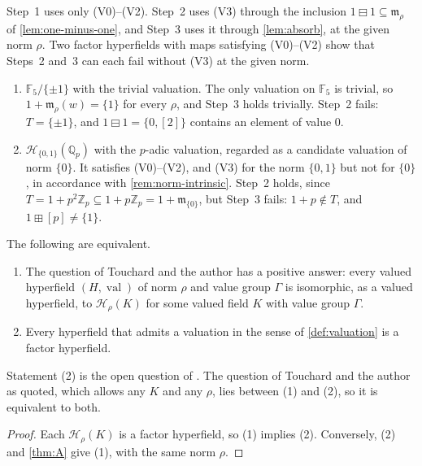 \documentclass[11pt]{amsart}
\numberwithin{equation}{section}
\newcommand{\hplus}{\boxplus}
\newcommand{\hminus}{\boxminus}
\newcommand{\val}{\operatorname{val}}
\newcommand{\m}{\mathfrak m}
\newcommand{\Hr}{\mathcal H_\rho}
\newcommand{\Z}{\mathbb Z}
\newcommand{\F}{\mathbb F}
\newcommand{\cls}[1]{[#1]}
\begin{document}
\begin{remark}\label{rem:audit}
Step~1 uses only (V0)--(V2). Step~2 uses (V3) through the inclusion $1\hminus1\subseteq\m_\rho$ of \cref{lem:one-minus-one}, and Step~3 uses it through \cref{lem:absorb}, at the given norm $\rho$. Two factor hyperfields with maps satisfying (V0)--(V2) show that Steps~2 and~3 can each fail without (V3) at the given norm.
\begin{enumerate}
\item $\F_5/\{\pm1\}$ with the trivial valuation. The only valuation on $\F_5$ is trivial, so $1+\m_\rho(w)=\{1\}$ for every $\rho$, and Step~3 holds trivially. Step~2 fails: $T=\{\pm1\}$, and $1\hminus1=\{0,\cls2\}$ contains an element of value $0$.
\item $\mathcal H_{\{0,1\}}(\mathbb Q_p)$ with the $p$-adic valuation, regarded as a candidate valuation of norm $\{0\}$. It satisfies (V0)--(V2), and (V3) for the norm $\{0,1\}$ but not for $\{0\}$, in accordance with \cref{rem:norm-intrinsic}. Step~2 holds, since $T=1+p^2\Z_p\subseteq1+p\Z_p=1+\m_{\{0\}}$, but Step~3 fails: $1+p\notin T$, and $1\hplus\cls p\ne\{1\}$.
\end{enumerate}
\end{remark}

\begin{corollary}\label{cor:equivalent}
The following are equivalent.
\begin{enumerate}
\item The question of Touchard and the author has a positive answer: every valued hyperfield $(H,\val)$ of norm $\rho$ and value group $\Gamma$ is isomorphic, as a valued hyperfield, to $\Hr(K)$ for some valued field $K$ with value group $\Gamma$.
\item Every hyperfield that admits a valuation in the sense of \cref{def:valuation} is a factor hyperfield.
\end{enumerate}
\end{corollary}

Statement (2) is the open question of \cite[Remark~4.12]{Linzi25}. The question of Touchard and the author as quoted, which allows any $K$ and any $\rho$, lies between (1) and (2), so it is equivalent to both.

\begin{proof}
Each $\Hr(K)$ is a factor hyperfield, so (1) implies (2). Conversely, (2) and \cref{thm:A} give (1), with the same norm $\rho$.
\end{proof}
\end{document}
